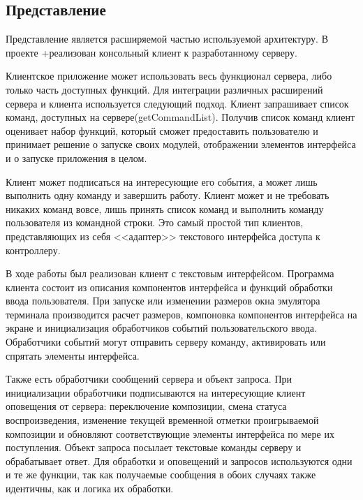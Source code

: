 \subsection{Представление}

Представление является расширяемой частью используемой архитектуру. В проекте
+реализован консольный клиент к разработанному серверу.

Клиентское приложение может использовать весь функционал сервера, либо только часть
доступных функций. Для интеграции различных расширений сервера и клиента
используется следующий подход. Клиент запрашивает список команд,
доступных на сервере(getCommandList). Получив список команд клиент
оценивает набор функций, который сможет предоставить 
пользователю и принимает решение о запуске своих модулей, отображении
элементов интерфейса и о запуске приложения в целом.

Клиент может подписаться на интересующие его события, а может лишь выполнить одну
команду и завершить работу. Клиент может и не требовать никаких команд
вовсе, лишь принять список команд и выполнить команду пользователя из
командной строки. Это самый простой тип клиентов, представляющих из
себя <<адаптер>> текстового интерфейса доступа к контроллеру.




В ходе работы был реализован клиент с текстовым интерфейсом. Программа
клиента состоит из описания компонентов интерфейса и функций обработки
ввода пользователя. При запуске или изменении размеров окна эмулятора
терминала производится расчет размеров, компоновка компонентов
интерфейса на экране и инициализация обработчиков событий
пользовательского ввода. Обработчики событий могут отправить серверу
команду, активировать или спрятать элементы интерфейса.

Также есть обработчики сообщений сервера и объект запроса. При
инициализации обработчики подписываются на интересующие клиент
оповещения от сервера: переключение композиции, смена статуса
воспроизведения, изменение текущей временной отметки проигрываемой
композиции и обновляют соответствующие элементы интерфейса по мере их
поступления. Объект запроса посылает текстовые команды серверу и
обрабатывает ответ. Для обработки и оповещений и запросов используются одни и
те же функции, так как получаемые сообщения в обоих случаях также идентичны, как и
логика их обработки.


